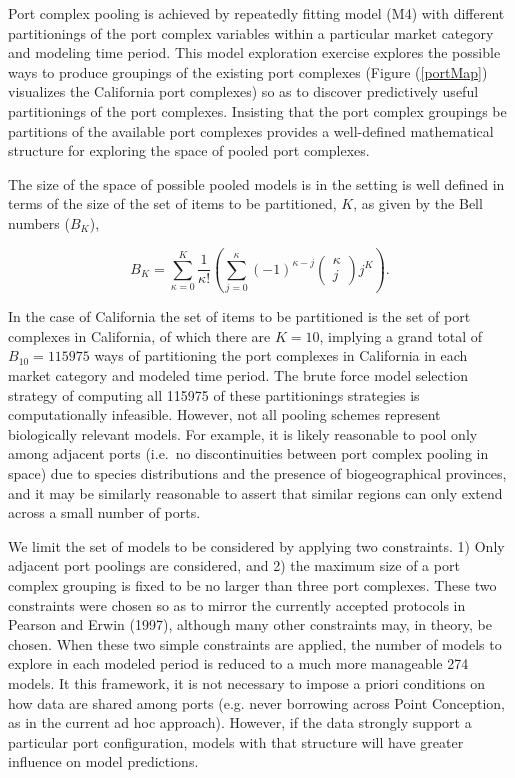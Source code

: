 \documentclass[12pt]{article}
\begin{document}
Port complex pooling is achieved by repeatedly fitting model (M4) with
different partitionings of the port complex variables within a
particular market category and modeling time period. This model
exploration exercise explores the possible ways to produce groupings of
the existing port complexes (Figure (\ref{portMap}) visualizes the California port 
complexes) so as to discover predictively useful partitionings of the port 
complexes. Insisting that the port complex groupings be partitions of the 
available port complexes provides a well-defined mathematical structure for 
exploring the space of pooled port complexes.

The size of the space of possible pooled models is in the setting is
well defined in terms of the size of the set of items to be partitioned,
\(K\), as given by the Bell numbers (\(B_K\)),

\[B_K=\sum_{\kappa=0}^{K} \frac{1}{\kappa!} \left( \sum_{j=0}^{\kappa} (-1)^{\kappa-j} \left(\substack{\kappa \\ j}\right) j^K \right).\]

In the case of California the set of items to be partitioned is the set
of port complexes in California, of which there are \(K=10\), implying a
grand total of \(B_{10}=115975\) ways of partitioning the port complexes
in California in each market category and modeled time period. The brute
force model selection strategy of computing all 115975 of these
partitionings strategies is computationally infeasible. However, not all
pooling schemes represent biologically relevant models. For example, it
is likely reasonable to pool only among adjacent ports (i.e.~no
discontinuities between port complex pooling in space) due to species
distributions and the presence of biogeographical provinces, and it may
be similarly reasonable to assert that similar regions can only extend
across a small number of ports.

We limit the set of models to be considered by applying two constraints. 
1) Only adjacent port poolings are considered, and 2) the maximum size of a 
port complex grouping is fixed to be no larger than three port complexes. 
These two constraints were chosen so as to mirror the currently accepted 
protocols in Pearson and Erwin (1997), although many other constraints may, in 
theory, be chosen.
When these two simple constraints are applied, the number of models to
explore in each modeled period is reduced to a much more manageable 274
models. It this framework, it is not necessary to impose a priori conditions 
on how data are shared among ports (e.g. never borrowing across Point 
Conception, as in the current ad hoc approach). However, if the data strongly 
support a particular port configuration, models with that structure will have 
greater influence on model predictions.
\end{document}
